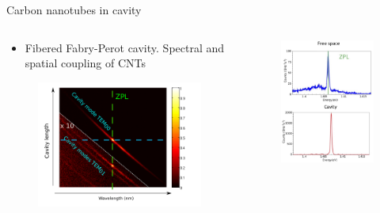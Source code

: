 \documentclass[xcolor = {dvipsnames}]{beamer}
\begin{document}
\begin{frame}{Carbon nanotubes in cavity}

\begin{columns}
\begin{column}{0.6\textwidth}
\begin{itemize}
	\item <1-> Fibered Fabry-Perot cavity. \textcolor{verde}{Spectral} and \textcolor{Cerulean}{spatial} coupling of CNTs
\end{itemize}
\vspace{-3mm}
  \begin{figure}
  \centering
  \includegraphics[width=1\textwidth]{images/match}
  \end{figure}
  \end{column}
  \begin{column}{0.4\textwidth}
   \begin{figure}
  \centering
  \includegraphics[width=.8\textwidth]{images/ZPL}

\end{figure}
\end{column}
\end{columns}
\end{frame}
\end{document}
